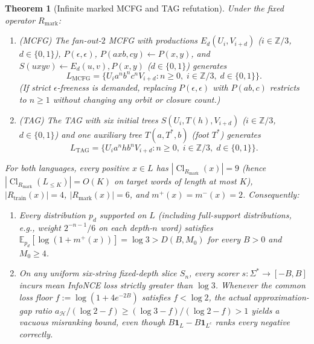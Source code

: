 \documentclass[11pt]{article}
\theoremstyle{plain}
\newtheorem{theorem}{Theorem}
\theoremstyle{definition}
\theoremstyle{remark}
\DeclareMathOperator{\Cl}{Cl}
\begin{document}
\begin{theorem}[Infinite marked MCFG and TAG refutation]\label{thm:marked}
Under the fixed operator $R_{\mathrm{mark}}$:
\begin{enumerate}[label=\textup{(\arabic*)}]
\item \emph{(MCFG)} The fan-out-$2$ MCFG with productions $E_d(U_i, V_{i+d})$ ($i \in \mathbb{Z}/3$, $d \in \{0, 1\}$), $P(\epsilon, \epsilon)$, $P(axb, cy) \leftarrow P(x, y)$, and $S(uxyv) \leftarrow E_d(u, v), P(x, y)$ ($d \in \{0, 1\}$) generates
\[
L_{\mathrm{MCFG}} = \{U_i a^n b^n c^n V_{i+d} : n \ge 0,\; i \in \mathbb{Z}/3,\; d \in \{0, 1\}\}.
\]
(If strict $\epsilon$-freeness is demanded, replacing $P(\epsilon, \epsilon)$ with $P(ab, c)$ restricts to $n \ge 1$ without changing any orbit or closure count.)
\item \emph{(TAG)} The TAG with six initial trees $S(U_i, T(h), V_{i+d})$ ($i \in \mathbb{Z}/3$, $d \in \{0, 1\}$) and one auxiliary tree $T(a, T^*, b)$ (foot $T^*$) generates
\[
L_{\mathrm{TAG}} = \{U_i a^n h b^n V_{i+d} : n \ge 0,\; i \in \mathbb{Z}/3,\; d \in \{0, 1\}\}.
\]
\end{enumerate}
For both languages, every positive $x \in L$ has $|\Cl_{R_{\mathrm{mark}}}(x)| = 9$ (hence $|\Cl_{R_{\mathrm{mark}}}(L_{\le K})| = O(K)$ on target words of length at most $K$), $|R_{\mathrm{train}}(x)| = 4$, $|R_{\mathrm{mark}}(x)| = 6$, and $m^+(x) = m^-(x) = 2$. Consequently:
\begin{enumerate}[label=\textup{(\alph*)}]
\item Every distribution $p_d$ supported on $L$ (including full-support distributions, e.g., weight $2^{-n-1}/6$ on each depth-$n$ word) satisfies $\mathbb{E}_{p_d}[\log(1 + m^+(x))] = \log 3 > D(B, M_0)$ for every $B > 0$ and $M_0 \ge 4$.
\item On any uniform six-string fixed-depth slice $S_n$, every scorer $s : \Sigma^* \to [-B, B]$ incurs mean InfoNCE loss strictly greater than $\log 3$. Whenever the common loss floor $f := \log(1 + 4e^{-2B})$ satisfies $f < \log 2$, the actual approximation-gap ratio $a_{\mathcal{H}}/(\log 2 - f) \ge (\log 3 - f)/(\log 2 - f) > 1$ yields a vacuous misranking bound, even though $B\mathbf{1}_L - B\mathbf{1}_{L^c}$ ranks every negative correctly.
\end{enumerate}
\end{theorem}
\end{document}
